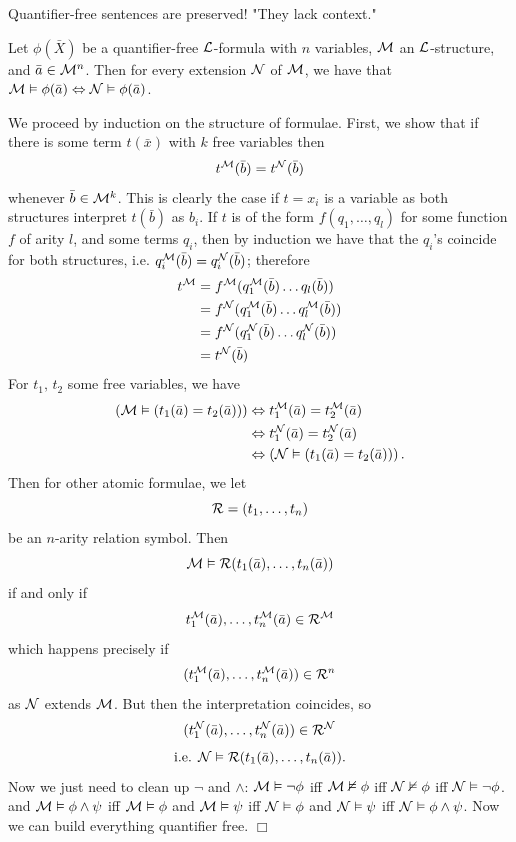 \documentclass{article}
\numberwithin{thm}{subsection}
\begin{document}
Quantifier-free sentences are preserved! "They lack context."
\begin{fancyprop}{}
Let $\phi(\bar{X})$ be a quantifier-free $\mathcal{L}$-formula with $n$ variables, $\mathcal{M}$ an $\mathcal{L}$-structure, and $\bar{a} \in \mathcal{M}^{n}$. \gap
Then for every extension $\mathcal{N}$ of $\mathcal{M}$, we have that $\mathcal{M} \vDash \phi(\bar{a}) \Leftrightarrow \mathcal{N} \vDash \phi(\bar{a})$.
\end{fancyprop}
\proof We proceed by induction on the structure of formulae. \gap
First, we show that if there is some term $t(\bar{x})$ with $k$ free variables then \[ t^{\mathcal{M}}(\bar{b}) = t^{\mathcal{N}}(\bar{b}) \] whenever $\bar{b} \in \mathcal{M}^{k}$. This is clearly the case if $t=x_{i}$ is a variable as both structures interpret $t(\bar{b})$ as $b_{i}$. \gap
If $t$ is of the form $f(q_{1}, \dots, q_{l})$ for some function $f$ of arity $l$, and some terms $q_{i}$, then by induction we have that the $q_{i}$'s coincide for both structures, i.e. $q_{i}^{\mathcal{M}}(\bar{b}) = q_{i}^{\mathcal{N}}(\bar{b})$; therefore
\begin{align*}
    t^{\mathcal{M}}&=f^{\mathcal{M}}(q_{1}^{\mathcal{M}}(\bar{b}) \dots q_{l}(\bar{b}))\\
    &= f^{\mathcal{N}}(q_{1}^{\mathcal{M}}(\bar{b}) \dots q_{l}^{\mathcal{M}}(\bar{b}))\\
    &= f^{\mathcal{N}}(q_{1}^{\mathcal{N}}(\bar{b}) \dots q_{l}^{\mathcal{N}}(\bar{b}))\\
    &= t^{\mathcal{N}}(\bar{b})
\end{align*}
For $t_{1},\,t_{2}$ some free variables, we have
\begin{align*}
    \left(\mathcal{M} \vDash (t_{1}(\bar{a}) = t_{2}(\bar{a}))\right) &\Leftrightarrow t_{1}^{\mathcal{M}}(\bar{a})=t_{2}^{\mathcal{M}}(\bar{a})\\
    &\Leftrightarrow t_{1}^{\mathcal{N}}(\bar{a}) = t_{2}^{\mathcal{N}}(\bar{a})\\
    &\Leftrightarrow \left(\mathcal{N} \vDash (t_{1}(\bar{a}) = t_{2}(\bar{a}))\right).
\end{align*}
Then for other atomic formulae, we let
\[ \mathcal{R} = (t_{1}, \dots, t_{n}) \]
be an $n$-arity relation symbol. Then
\[ \mathcal{M} \vDash \mathcal{R}(t_{1}(\bar{a}), \dots , t_{n}(\bar{a})) \]
if and only if
\[ t_{1}^{\mathcal{M}}(\bar{a}),\dots,t_{n}^{\mathcal{M}}(\bar{a}) \in \mathcal{R}^{\mathcal{M}}\]
which happens precisely if \[ (t_{1}^{\mathcal{M}}(\bar{a}),\dots, t_{n}^{\mathcal{M}}(\bar{a})) \in \mathcal{R}^{n} \]
as $\mathcal{N}$ extends $\mathcal{M}$. But then the interpretation coincides, so
\[ (t_{1}^{\mathcal{N}}(\bar{a}), \dots, t_{n}^{\mathcal{N}}(\bar{a})) \in \mathcal{R}^{\mathcal{N}}\]
\[ \text{i.e. } \mathcal{N} \vDash \mathcal{R}(t_{1}(\bar{a}),\dots, t_{n}(\bar{a})).\]
Now we just need to clean up $\neg$ and $\wedge$: \gap
$\mathcal{M} \vDash \neg \phi$ iff $\mathcal{M} \nvDash \phi$ iff $\mathcal{N} \nvDash \phi$ iff $\mathcal{N} \vDash \neg \phi$.
\gap
and $\mathcal{M} \vDash \phi \wedge \psi$ iff $\mathcal{M} \vDash \phi$ and $\mathcal{M} \vDash \psi$ iff $\mathcal{N} \vDash \phi$ and $\mathcal{N} \vDash \psi$ iff $\mathcal{N} \vDash \phi \wedge \psi$. Now we can build everything quantifier free. \flushright $\Box$ \flushleft 
\end{document}
